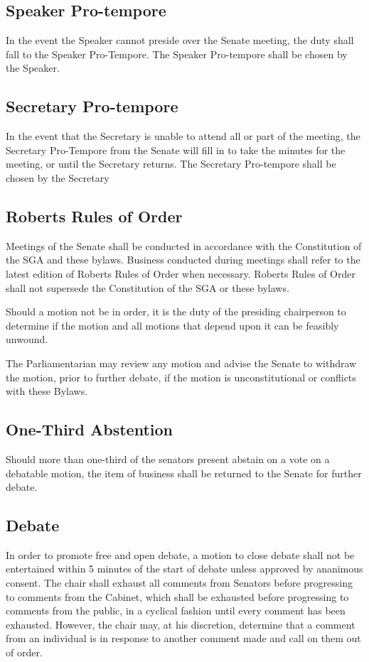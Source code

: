 \documentclass[12pt]{scrreprt}
\begin{document}
\subsection{Speaker Pro-tempore}
In the event the Speaker cannot preside over the Senate meeting, the duty 
shall fall to the Speaker Pro-Tempore. The Speaker Pro-tempore shall be chosen 
by the Speaker. 

\subsection{Secretary Pro-tempore}
In the event that the Secretary is unable to attend all or part of the 
meeting, the Secretary Pro-Tempore from the Senate will fill in to take the 
minutes for the meeting, or until the Secretary returns. The Secretary 
Pro-tempore shall be chosen by the Secretary

\subsection{Roberts Rules of Order}
Meetings of the Senate shall be conducted in accordance with the Constitution 
of the SGA and these bylaws. Business conducted during meetings shall refer to 
the latest edition of Roberts Rules of Order when necessary. Roberts Rules of 
Order shall not supersede the Constitution of the SGA or these bylaws. 

Should a motion not be in order, it is the duty of the presiding chairperson 
to determine if the motion and all motions that depend upon it can be feasibly 
unwound. 

The Parliamentarian may review any motion and advise the Senate to withdraw 
the motion, prior to further debate, if the motion is unconstitutional or 
conflicts with these Bylaws. 

\subsection{One-Third Abstention}
Should more than one-third of the senators present abstain on a vote on a 
debatable motion, the item of business shall be returned to the Senate for 
further debate. 

\subsection{Debate}
In order to promote free and open debate, a motion to close debate shall not 
be entertained within 5 minutes of the start of debate unless approved by ananimous consent. The chair shall exhaust all comments from Senators before progressing to comments from the Cabinet, which shall be exhausted before progressing to comments from the public, in a cyclical fashion until every comment has been exhausted. However, the chair may, at his discretion, determine that a comment from an individual is in response to another comment made and call on them out of order. 
\end{document}
